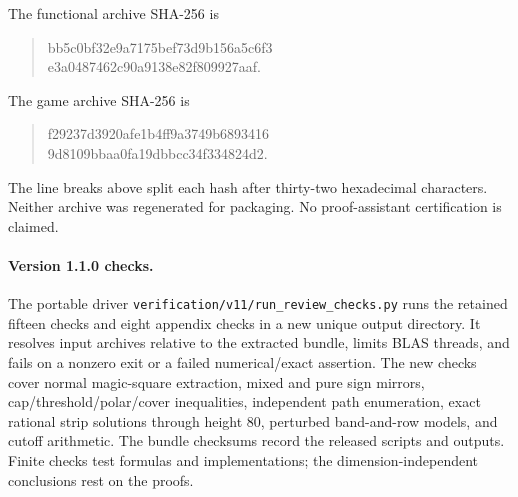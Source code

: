 The functional archive SHA-256 is
\begin{quote}\small\ttfamily
bb5c0bf32e9a7175bef73d9b156a5c6f3\\
e3a0487462c90a9138e82f809927aaf.
\end{quote}
The game archive SHA-256 is
\begin{quote}\small\ttfamily
f29237d3920afe1b4ff9a3749b6893416\\
9d8109bbaa0fa19dbbcc34f334824d2.
\end{quote}
The line breaks above split each hash after thirty-two hexadecimal characters. Neither archive was regenerated for packaging. No proof-assistant certification is claimed.

\paragraph{Version 1.1.0 checks.}
The portable driver \texttt{verification/v11/run\_review\_checks.py} runs the retained fifteen checks and eight appendix checks in a new unique output directory. It resolves input archives relative to the extracted bundle, limits BLAS threads, and fails on a nonzero exit or a failed numerical/exact assertion. The new checks cover normal magic-square extraction, mixed and pure sign mirrors, cap/threshold/polar/cover inequalities, independent path enumeration, exact rational strip solutions through height 80, perturbed band-and-row models, and cutoff arithmetic. The bundle checksums record the released scripts and outputs. Finite checks test formulas and implementations; the dimension-independent conclusions rest on the proofs.
